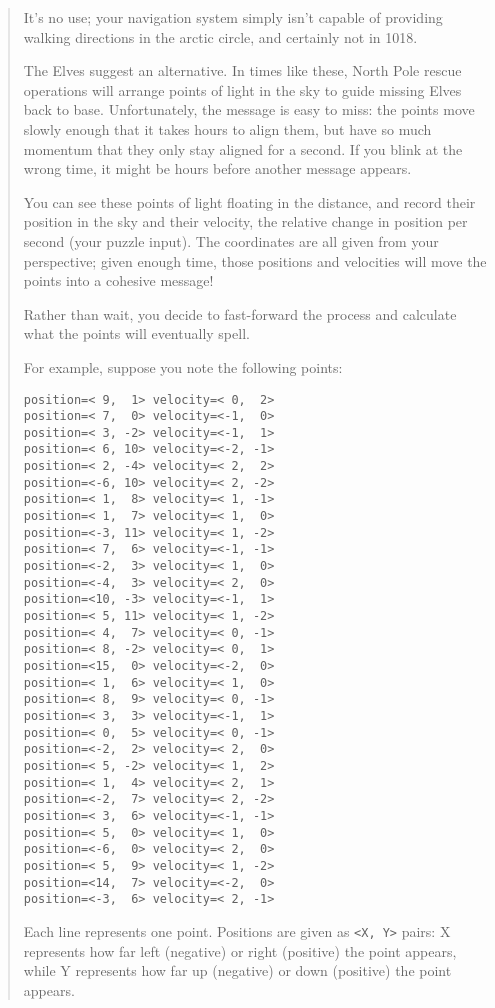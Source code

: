 \documentclass[]{article}
\begin{document}
\begin{quote}
It's no use; your navigation system simply isn't capable of providing walking
directions in the arctic circle, and certainly not in 1018.

The Elves suggest an alternative. In times like these, North Pole rescue
operations will arrange points of light in the sky to guide missing Elves back
to base. Unfortunately, the message is easy to miss: the points move slowly
enough that it takes hours to align them, but have so much momentum that they
only stay aligned for a second. If you blink at the wrong time, it might be
hours before another message appears.

You can see these points of light floating in the distance, and record their
position in the sky and their velocity, the relative change in position per
second (your puzzle input). The coordinates are all given from your perspective;
given enough time, those positions and velocities will move the points into a
cohesive message!

Rather than wait, you decide to fast-forward the process and calculate what the
points will eventually spell.

For example, suppose you note the following points:

\begin{verbatim}
position=< 9,  1> velocity=< 0,  2>
position=< 7,  0> velocity=<-1,  0>
position=< 3, -2> velocity=<-1,  1>
position=< 6, 10> velocity=<-2, -1>
position=< 2, -4> velocity=< 2,  2>
position=<-6, 10> velocity=< 2, -2>
position=< 1,  8> velocity=< 1, -1>
position=< 1,  7> velocity=< 1,  0>
position=<-3, 11> velocity=< 1, -2>
position=< 7,  6> velocity=<-1, -1>
position=<-2,  3> velocity=< 1,  0>
position=<-4,  3> velocity=< 2,  0>
position=<10, -3> velocity=<-1,  1>
position=< 5, 11> velocity=< 1, -2>
position=< 4,  7> velocity=< 0, -1>
position=< 8, -2> velocity=< 0,  1>
position=<15,  0> velocity=<-2,  0>
position=< 1,  6> velocity=< 1,  0>
position=< 8,  9> velocity=< 0, -1>
position=< 3,  3> velocity=<-1,  1>
position=< 0,  5> velocity=< 0, -1>
position=<-2,  2> velocity=< 2,  0>
position=< 5, -2> velocity=< 1,  2>
position=< 1,  4> velocity=< 2,  1>
position=<-2,  7> velocity=< 2, -2>
position=< 3,  6> velocity=<-1, -1>
position=< 5,  0> velocity=< 1,  0>
position=<-6,  0> velocity=< 2,  0>
position=< 5,  9> velocity=< 1, -2>
position=<14,  7> velocity=<-2,  0>
position=<-3,  6> velocity=< 2, -1>
\end{verbatim}

Each line represents one point. Positions are given as
\texttt{\textless{}X,\ Y\textgreater{}} pairs: X represents how far left
(negative) or right (positive) the point appears, while Y represents how far up
(negative) or down (positive) the point appears.


\end{quote}
\end{document}
